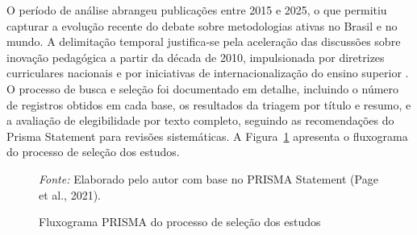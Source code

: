 O período de análise abrangeu publicações entre 2015 e 2025, o que permitiu capturar a evolução recente do debate sobre metodologias ativas no Brasil e no mundo. A delimitação temporal justifica-se pela aceleração das discussões sobre inovação pedagógica a partir da década de 2010, impulsionada por diretrizes curriculares nacionais e por iniciativas de internacionalização do ensino superior \cite{SANTOS2024}. O processo de busca e seleção foi documentado em detalhe, incluindo o número de registros obtidos em cada base, os resultados da triagem por título e resumo, e a avaliação de elegibilidade por texto completo, seguindo as recomendações do Prisma Statement para revisões sistemáticas. A Figura~\ref{fig:prisma} apresenta o fluxograma do processo de seleção dos estudos.

\begin{figure}[htbp]
    \centering
    \caption{Fluxograma PRISMA do processo de seleção dos estudos}
    \label{fig:prisma}
    \par\medskip
    \footnotesize{\textit{Fonte:} Elaborado pelo autor com base no PRISMA Statement (Page et al., 2021).}
\end{figure}

